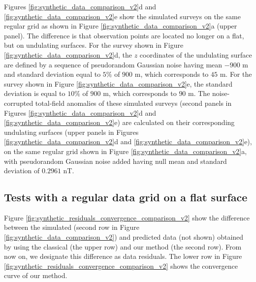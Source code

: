 \documentclass[manuscript]{geophysics}
\begin{document}

Figures \ref{fig:synthetic_data_comparison_v2}d and \ref{fig:synthetic_data_comparison_v2}e 
show the simulated surveys on the same regular grid as shown in Figure 
\ref{fig:synthetic_data_comparison_v2}a (upper panel). The difference is that observation points
are located no longer on a flat, but on undulating surfaces.
For the survey shown in Figure \ref{fig:synthetic_data_comparison_v2}d, the $z$ coordinates 
of the undulating surface are defined by a sequence of pseudorandom Gaussian noise having mean 
$-900$ m and standard deviation equal to $5\%$ of $900$ m, which corresponds to $45$ m.
For the survey shown in Figure \ref{fig:synthetic_data_comparison_v2}e, the standard deviation 
is equal to $10\%$ of $900$ m, which corresponds to $90$ m.
The noise-corrupted total-field anomalies of these simulated surveys (second panels in Figures 
\ref{fig:synthetic_data_comparison_v2}d and \ref{fig:synthetic_data_comparison_v2}e) are calculated 
on their corresponding undulating surfaces (upper panels in Figures 
\ref{fig:synthetic_data_comparison_v2}d and \ref{fig:synthetic_data_comparison_v2}e),
on the same regular grid shown in Figure \ref{fig:synthetic_data_comparison_v2}a,
with pseudorandom Gaussian noise added having null mean and standard deviation of $0.2961$ nT.


\subsection*{Tests with a regular data grid on a flat surface}

Figure \ref{fig:synthetic_residuals_convergence_comparison_v2} show the 
difference between the simulated (second row in Figure \ref{fig:synthetic_data_comparison_v2})
and predicted data (not shown) obtained by using the classical (the upper row) and 
our method (the second row). From now on, we designate this difference as data residuals. 
The lower row in Figure \ref{fig:synthetic_residuals_convergence_comparison_v2} shows the 
convergence curve of our method.
\end{document}
